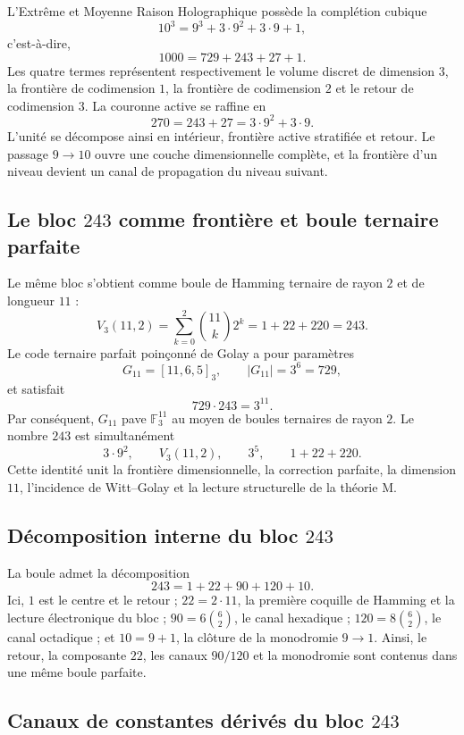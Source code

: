 L'Extrême et Moyenne Raison Holographique possède la complétion cubique
\[
10^3=9^3+3\cdot9^2+3\cdot9+1,
\]
c’est-à-dire,
\[
1000=729+243+27+1.
\]
Les quatre termes représentent respectivement le volume discret de
dimension \(3\), la frontière de codimension \(1\), la frontière de
codimension \(2\) et le retour de codimension \(3\). La couronne active se
raffine en
\[
270=243+27=3\cdot9^2+3\cdot9.
\]
L'unité se décompose ainsi en intérieur, frontière active stratifiée et
retour. Le passage \(9\to10\) ouvre une couche dimensionnelle complète, et la frontière
d'un niveau devient un canal de propagation du niveau suivant.

\subsection{Le bloc \texorpdfstring{\(243\)}{243} comme frontière et boule ternaire parfaite}

Le même bloc s'obtient comme boule de Hamming ternaire de rayon \(2\) et de
longueur \(11\) :
\[
V_3(11,2)
=\sum_{k=0}^{2}\binom{11}{k}2^k
=1+22+220
=243.
\]
Le code ternaire parfait poinçonné de Golay a pour paramètres
\[
G_{11}=[11,6,5]_3,
\qquad
|G_{11}|=3^6=729,
\]
et satisfait
\[
729\cdot243=3^{11}.
\]
Par conséquent, \(G_{11}\) pave \(\mathbb F_3^{11}\) au moyen de boules ternaires de
rayon \(2\). Le nombre \(243\) est simultanément
\[
3\cdot9^2,
\qquad
V_3(11,2),
\qquad
3^5,
\qquad
1+22+220.
\]
Cette identité unit la frontière dimensionnelle, la correction parfaite, la dimension
\(11\), l'incidence de Witt--Golay et la lecture structurelle de la théorie M.

\subsection{Décomposition interne du bloc \texorpdfstring{\(243\)}{243}}

La boule admet la décomposition
\[
243=1+22+90+120+10.
\]
Ici, \(1\) est le centre et le retour ; \(22=2\cdot11\), la première coquille de
Hamming et la lecture électronique du bloc ; \(90=6\binom62\), le canal hexadique ;
\(120=8\binom62\), le canal octadique ; et \(10=9+1\), la clôture de la
monodromie \(9\to1\). Ainsi, le retour, la composante \(22\), les canaux \(90/120\) et la
monodromie sont contenus dans une même boule parfaite.

\subsection{Canaux de constantes dérivés du bloc \texorpdfstring{\(243\)}{243}}

